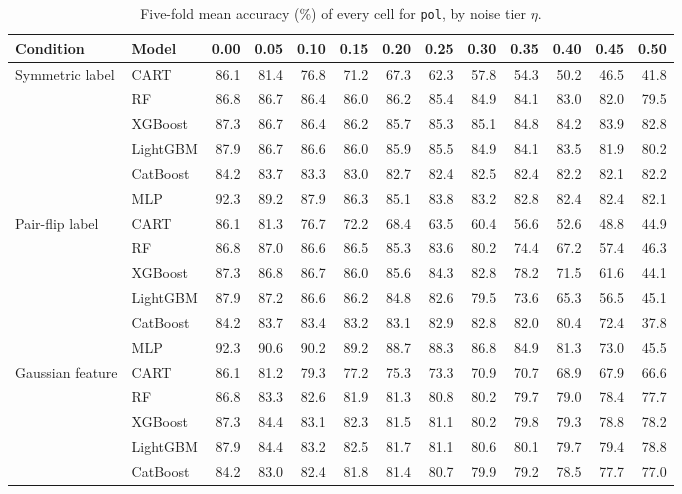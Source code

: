 \begin{table}[p]
\centering
\tiny
\setlength{\tabcolsep}{2.6pt}
\caption{Five-fold mean accuracy (\%) of every cell for \texttt{pol}, by noise tier $\eta$.}
\label{tab:grid_pol}
\begin{tabular}{@{}llrrrrrrrrrrr@{}}
\toprule
Condition & Model & 0.00 & 0.05 & 0.10 & 0.15 & 0.20 & 0.25 & 0.30 & 0.35 & 0.40 & 0.45 & 0.50 \\
\midrule
Symmetric label & CART & 86.1 & 81.4 & 76.8 & 71.2 & 67.3 & 62.3 & 57.8 & 54.3 & 50.2 & 46.5 & 41.8 \\
 & RF & 86.8 & 86.7 & 86.4 & 86.0 & 86.2 & 85.4 & 84.9 & 84.1 & 83.0 & 82.0 & 79.5 \\
 & XGBoost & 87.3 & 86.7 & 86.4 & 86.2 & 85.7 & 85.3 & 85.1 & 84.8 & 84.2 & 83.9 & 82.8 \\
 & LightGBM & 87.9 & 86.7 & 86.6 & 86.0 & 85.9 & 85.5 & 84.9 & 84.1 & 83.5 & 81.9 & 80.2 \\
 & CatBoost & 84.2 & 83.7 & 83.3 & 83.0 & 82.7 & 82.4 & 82.5 & 82.4 & 82.2 & 82.1 & 82.2 \\
 & MLP & 92.3 & 89.2 & 87.9 & 86.3 & 85.1 & 83.8 & 83.2 & 82.8 & 82.4 & 82.4 & 82.1 \\
\midrule
Pair-flip label & CART & 86.1 & 81.3 & 76.7 & 72.2 & 68.4 & 63.5 & 60.4 & 56.6 & 52.6 & 48.8 & 44.9 \\
 & RF & 86.8 & 87.0 & 86.6 & 86.5 & 85.3 & 83.6 & 80.2 & 74.4 & 67.2 & 57.4 & 46.3 \\
 & XGBoost & 87.3 & 86.8 & 86.7 & 86.0 & 85.6 & 84.3 & 82.8 & 78.2 & 71.5 & 61.6 & 44.1 \\
 & LightGBM & 87.9 & 87.2 & 86.6 & 86.2 & 84.8 & 82.6 & 79.5 & 73.6 & 65.3 & 56.5 & 45.1 \\
 & CatBoost & 84.2 & 83.7 & 83.4 & 83.2 & 83.1 & 82.9 & 82.8 & 82.0 & 80.4 & 72.4 & 37.8 \\
 & MLP & 92.3 & 90.6 & 90.2 & 89.2 & 88.7 & 88.3 & 86.8 & 84.9 & 81.3 & 73.0 & 45.5 \\
\midrule
Gaussian feature & CART & 86.1 & 81.2 & 79.3 & 77.2 & 75.3 & 73.3 & 70.9 & 70.7 & 68.9 & 67.9 & 66.6 \\
 & RF & 86.8 & 83.3 & 82.6 & 81.9 & 81.3 & 80.8 & 80.2 & 79.7 & 79.0 & 78.4 & 77.7 \\
 & XGBoost & 87.3 & 84.4 & 83.1 & 82.3 & 81.5 & 81.1 & 80.2 & 79.8 & 79.3 & 78.8 & 78.2 \\
 & LightGBM & 87.9 & 84.4 & 83.2 & 82.5 & 81.7 & 81.1 & 80.6 & 80.1 & 79.7 & 79.4 & 78.8 \\
 & CatBoost & 84.2 & 83.0 & 82.4 & 81.8 & 81.4 & 80.7 & 79.9 & 79.2 & 78.5 & 77.7 & 77.0 \\

\end{tabular}
\end{table}
